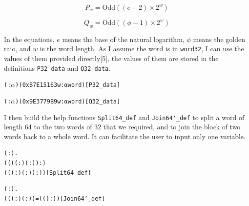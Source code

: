 \documentclass{article}
\begin{document}
\begin{equation*}
P_w = \text{Odd}((e - 2) \times 2^w)
\end{equation*}

\begin{equation*}
Q_w = \text{Odd}((\phi - 1) \times 2^w)
\end{equation*}

In the equations, $e$ means the base of the natural logarithm, $\phi$ means the golden raio, and $w$ is the word length.
As I assume the word is in \verb|word32|, I can use the values of them provided directly[5], the values of them are stored
in the definitions \verb|P32_data| and \verb|Q32_data|.

\begin{alltt}
\HOLTokenTurnstile{} ( :\ensuremath{\alpha} ) \HOLSymConst{=} (0xB7E15163w :α word)\hfill{[P32_data]}
\end{alltt}

\begin{alltt}
\HOLTokenTurnstile{} ( :\ensuremath{\alpha} ) \HOLSymConst{=} (0x9E3779B9w :α word)\hfill{[Q32_data]}
\end{alltt}

I then build the help functions \verb|Split64_def| and \verb|Join64'_def| to split a word of length 64 to the two words of 32 that
we required, and to join the block of two words back to a whole word. It can facilitate the user to input only one variable.

\begin{alltt}
\HOLTokenTurnstile{} \HOLSymConst{\HOLTokenForall{}}( :).
       \HOLSymConst{=}
     (((( :) \HOLSymConst{\HOLTokenExtract{}} ( :))  :)\HOLSymConst{,}
      ((( :) \HOLSymConst{\HOLTokenExtract{}} ( :))  :))\hfill{[Split64_def]}
\end{alltt}

\begin{alltt}
\HOLTokenTurnstile{} \HOLSymConst{\HOLTokenForall{}}( :).
       \HOLSymConst{=}
     ( (( :)\HOLSymConst{,}( :)) =   ((  ) :))\hfill{[Join64'_def]}
\end{alltt}
\end{document}
